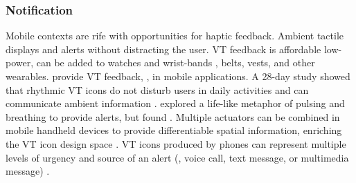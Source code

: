 \subsubsection{Notification}
Mobile contexts are rife with opportunities for haptic feedback.
Ambient tactile displays  and alerts without distracting the user.
 VT feedback is affordable  low-power,  can be added to watches and wrist-bands \cite{Brunet2013a,Arab2015}, belts, vests, and other wearables.
 provide VT feedback, \eg, in mobile applications.
A 28-day study showed that rhythmic VT icons do not disturb users in daily activities and can communicate ambient information \cite{Cauchard2016}.
\citet{Hemmert2008} explored a life-like metaphor of pulsing and breathing to provide alerts, but found .
Multiple actuators can be combined in mobile handheld devices to provide differentiable spatial information, enriching the VT icon design space \cite{Yatani2009a}.
VT icons produced by phones can represent multiple levels of urgency and  source of an alert (\eg, voice call, text message, or multimedia message) \cite{Brown2006mobilealerts}.


